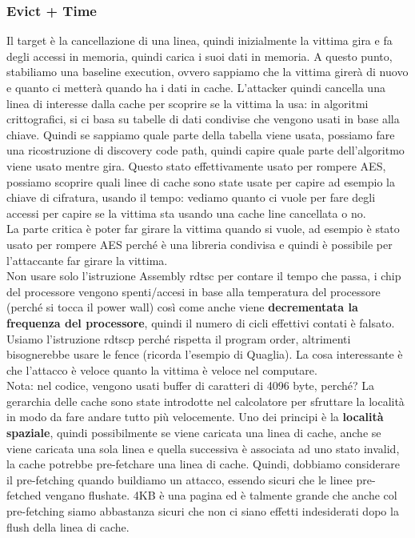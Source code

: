 \documentclass[12pt, oneside]{extbook} %
\begin{document}
\subsubsection{Evict + Time}
Il target è la cancellazione di una linea, quindi inizialmente la vittima gira e fa degli accessi in memoria, quindi carica i suoi dati in memoria. A questo punto, stabiliamo una baseline execution, ovvero sappiamo che la vittima girerà di nuovo e quanto ci metterà quando ha i dati in cache. L'attacker quindi cancella una linea di interesse dalla cache per scoprire se la vittima la usa: in algoritmi crittografici, si ci basa su tabelle di dati condivise che vengono usati in base alla chiave. Quindi se sappiamo quale parte della tabella viene usata, possiamo fare una ricostruzione di discovery code path, quindi capire quale parte dell'algoritmo viene usato mentre gira. Questo stato effettivamente usato per rompere AES, possiamo scoprire quali linee di cache sono state usate per capire ad esempio la chiave di cifratura, usando il tempo: vediamo quanto ci vuole per fare degli accessi per capire se la vittima sta usando una cache line cancellata o no.\\ La parte critica è poter far girare la vittima quando si vuole, ad esempio è stato usato per rompere AES perché è una libreria condivisa e quindi è possibile per l'attaccante far girare la vittima.\\ Non usare solo l'istruzione Assembly \textsf{rdtsc} per contare il tempo che passa, i chip del processore vengono spenti/accesi in base alla temperatura del processore (perché si tocca il power wall) così come anche viene \textbf{decrementata la frequenza del processore}, quindi il numero di cicli effettivi contati è falsato. Usiamo l'istruzione \textsf{rdtscp} perché rispetta il program order, altrimenti bisognerebbe usare le fence (ricorda l'esempio di Quaglia). La cosa interessante è che l'attacco è veloce quanto la vittima è veloce nel computare.\\ Nota: nel codice, vengono usati buffer di caratteri di 4096 byte, perché? La gerarchia delle cache sono state introdotte nel calcolatore per sfruttare la località in modo da fare andare tutto più velocemente. Uno dei principi è la \textbf{località spaziale}, quindi possibilmente se viene caricata una linea di cache, anche se viene caricata una sola linea e quella successiva è associata ad uno stato invalid, la cache potrebbe pre-fetchare una linea di cache. Quindi, dobbiamo considerare il pre-fetching quando buildiamo un attacco, essendo sicuri che le linee pre-fetched vengano flushate. 4KB è una pagina ed è talmente grande che anche col pre-fetching siamo abbastanza sicuri che non ci siano effetti indesiderati dopo la flush della linea di cache.
\end{document}
